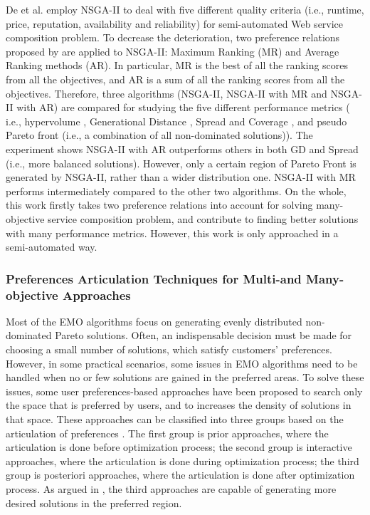 De et al. \cite{de2010many} employ NSGA-II to deal with five different quality criteria (i.e., runtime, price, reputation, availability and reliability) for semi-automated Web service composition problem.  To decrease the deterioration, two preference relations proposed by \cite{bentley1997finding} are applied to NSGA-II: Maximum Ranking (MR) and Average Ranking methods (AR). In particular, MR is the best of all the ranking scores from all the objectives, and AR is a sum of all the ranking scores from all the objectives. Therefore, three algorithms (NSGA-II, NSGA-II with MR and NSGA-II with AR) are compared for studying the five different performance metrics ( i.e., hypervolume \cite{zitzler1999evolutionary}, Generational Distance \cite{van2000measuring}, Spread and Coverage \cite{zitzler2000comparison}, and pseudo Pareto front (i.e., a combination of all non-dominated solutions)). The experiment shows NSGA-II with AR outperforms others in both GD and Spread (i.e., more balanced solutions). However, only a certain region of Pareto Front is generated by NSGA-II, rather than a wider distribution one. NSGA-II with MR performs intermediately compared to the other two algorithms. On the whole, this work firstly takes two preference relations into account for solving many-objective service composition problem, and contribute to finding better solutions with many performance metrics. However, this work is only approached in a semi-automated way.


\subsubsection{Preferences Articulation Techniques for Multi-and Many-objective Approaches}\label{PreferencesMultiObjective}
Most of the EMO algorithms focus on generating evenly distributed non-dominated Pareto solutions. Often, an indispensable decision must be made for choosing a small number of solutions, which satisfy customers' preferences. However, in some practical scenarios, some issues in EMO algorithms need to be handled when no or few solutions are gained in the preferred areas. To solve these issues, some user preferences-based approaches have been proposed to search only the space that is preferred by users, and to increases the density of solutions in that space. These approaches can be classified into three groups based on the articulation of preferences \cite{van2000multiobjective}. The first group is prior approaches, where the articulation is done before optimization process; the second group is interactive approaches, where the articulation is done during optimization process; the third group is posteriori approaches, where the articulation is done after optimization process. As argued in \cite{giagkiozis2014pareto}, the third approaches are capable of generating more desired solutions in the preferred region. 


